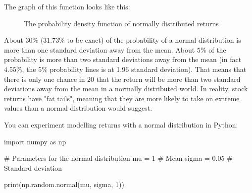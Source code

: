 The graph of this function looks like this:
\begin{figure}[!htbp]
    \centering
    \caption{The probability density function of normally distributed returns}
\end{figure}

About $30\%$ ($31.73\%$ to be exact) of the probability 
of a normal distribution is more than one standard deviation
away from the mean. About $5\%$ of the probability is more
than two standard deviations away from the mean (in fact 
$4.55\%$, the $5\%$ probability lines is at 1.96 standard deviation).
That means that there is only one chance in 20 that the return
will be more than two standard deviations away from the mean 
in a normally distributed world. In reality, stock returns 
have "fat tails", meaning that they are more likely to take 
on extreme values than a normal distribution would suggest.

You can experiment modelling returns with
a normal distribution in Python:

\begin{python}
import numpy as np

# Parameters for the normal distribution
mu = 1  # Mean
sigma = 0.05  # Standard deviation

print(np.random.normal(mu, sigma, 1))
\end{python}

